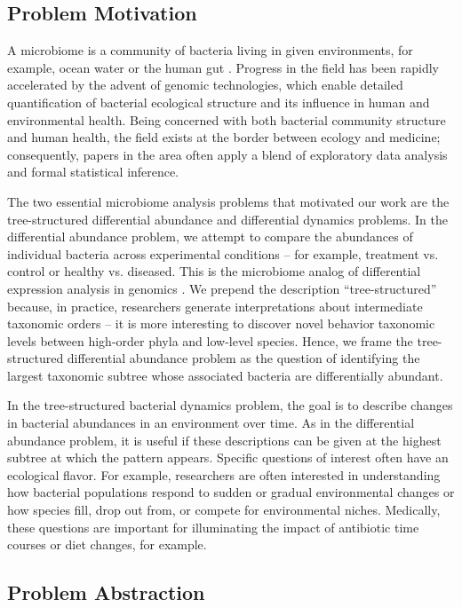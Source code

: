 \documentclass[12pt]{article}
\begin{document}
\subsection{Problem Motivation}\label{problem-motivation}

A microbiome is a community of bacteria living in given environments, for
example, ocean water or the human gut \citep{human2012structure, cho2012human}.
Progress in the field has been rapidly accelerated by the advent of genomic
technologies, which enable detailed quantification of bacterial ecological
structure and its influence in human and environmental health. Being concerned
with both bacterial community structure and human health, the field exists at
the border between ecology and medicine; consequently, papers in the area often
apply a blend of exploratory data analysis and formal statistical inference.

The two essential microbiome analysis problems that motivated our work are the
tree-structured differential abundance and differential dynamics problems. In
the differential abundance problem, we attempt to compare the abundances of
individual bacteria across experimental conditions -- for example, treatment vs.
control or healthy vs. diseased. This is the microbiome analog of differential
expression analysis in genomics \citep{anders2010differential}. We prepend the
description ``tree-structured'' because, in practice, researchers generate
interpretations about intermediate taxonomic orders -- it is more interesting to
discover novel behavior taxonomic levels between high-order phyla and low-level
species. Hence, we frame the tree-structured differential abundance problem as
the question of identifying the largest taxonomic subtree whose associated
bacteria are differentially abundant.

In the tree-structured bacterial dynamics problem, the goal is to describe
changes in bacterial abundances in an environment over time. As in the
differential abundance problem, it is useful if these descriptions can be given
at the highest subtree at which the pattern appears. Specific questions of
interest often have an ecological flavor. For example, researchers are often
interested in understanding how bacterial populations respond to sudden or
gradual environmental changes or how species fill, drop out from, or compete for
environmental niches. Medically, these questions are important for illuminating
the impact of antibiotic time courses or diet changes, for example.

\subsection{Problem Abstraction}\label{problem-abstraction}
\end{document}
